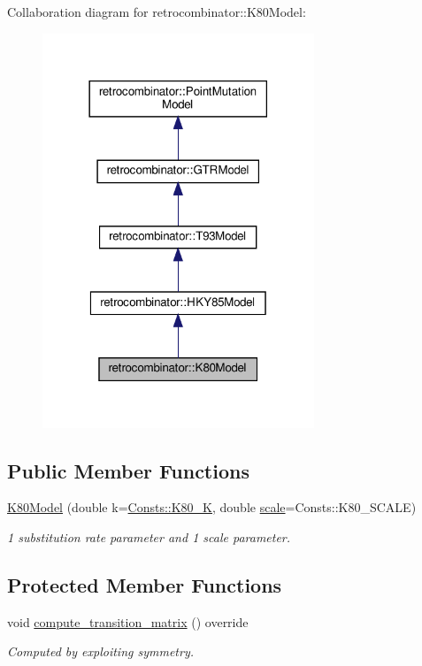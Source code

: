 Collaboration diagram for retrocombinator\+:\+:K80\+Model\+:\nopagebreak
\begin{figure}[H]
\begin{center}
\leavevmode
\includegraphics[width=230pt]{classretrocombinator_1_1K80Model__coll__graph}
\end{center}
\end{figure}
\subsection*{Public Member Functions}
\begin{DoxyCompactItemize}
\item 
\hyperlink{classretrocombinator_1_1K80Model_af199581e9a4d387f5e9e4f5bd048904b}{K80\+Model} (double k=\hyperlink{namespaceretrocombinator_1_1Consts_ac72fd4ec7b9dc3b42523a83cd69eaee2}{Consts\+::\+K80\+\_\+K}, double \hyperlink{classretrocombinator_1_1PointMutationModel_a3258dfbdae0f2614cdc66f13ae028b46}{scale}=Consts\+::\+K80\+\_\+\+S\+C\+A\+LE)
\begin{DoxyCompactList}\small\item\em 1 substitution rate parameter and 1 scale parameter. \end{DoxyCompactList}\end{DoxyCompactItemize}
\subsection*{Protected Member Functions}
\begin{DoxyCompactItemize}
\item 
\mbox{\label{classretrocombinator_1_1K80Model_a70f669e2a31d34a37b19fd185219a9ce}} 
void \hyperlink{classretrocombinator_1_1K80Model_a70f669e2a31d34a37b19fd185219a9ce}{compute\+\_\+transition\+\_\+matrix} () override
\begin{DoxyCompactList}\small\item\em Computed by exploiting symmetry. \end{DoxyCompactList}\end{DoxyCompactItemize}
